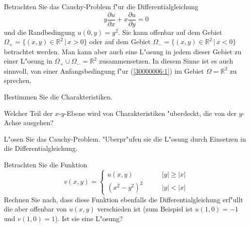 Betrachten Sie das Cauchy-Problem f"ur die Differentialgleichung
\begin{equation}
y\frac{\partial u}{\partial x}+x\frac{\partial u}{\partial y}=0
\label{30000006:1}
\end{equation}
und die Randbedingung $u(0,y)=y^2$.
Sie kann offenbar auf dem Gebiet $\Omega_+=\{ (x,y)\in\mathbb R^2\,|\, x > 0\}$
oder auf dem Gebiet $\Omega_-=\{(x,y)\in\mathbb R^2\,|\, x <0\}$ betrachtet
werden. Man kann aber auch eine L"osung in jedem dieser Gebiet zu einer
L"osung in $\Omega_+\cup\Omega_-=\mathbb R^2$ zusammensetzen. In diesem
Sinne ist es auch sinnvoll, von einer Anfangsbedingung f"ur
(\ref{30000006:1}) im Gebiet $\Omega=\mathbb R^2$ zu sprechen.
\begin{teilaufgaben}
\item Bestimmen Sie die Charakteristiken.
\item Welcher Teil der $x$-$y$-Ebene wird von Charakteristiken "uberdeckt,
die von der $y$-Achse ausgehen?
\item L"osen Sie das Cauchy-Problem. "Uberpr"ufen sie die L"osung durch
Einsetzen in die Differentialgleichung.
\item Betrachten Sie die Funktion
\[
v(x,y)=\begin{cases}
u(x,y)&\qquad |y|\ge |x|\\
(x^2-y^2)^2&\qquad |y|<|x|
\end{cases}
\]
Rechnen Sie nach, dass diese Funktion ebenfalls die Differentialgleichung
erf"ullt
die aber offenbar von $u(x,y)$ verschieden ist (zum Beispiel ist
$u(1,0)=-1$ und $v(1,0)=1$). Ist sie eine L"osung?
\end{teilaufgaben}

